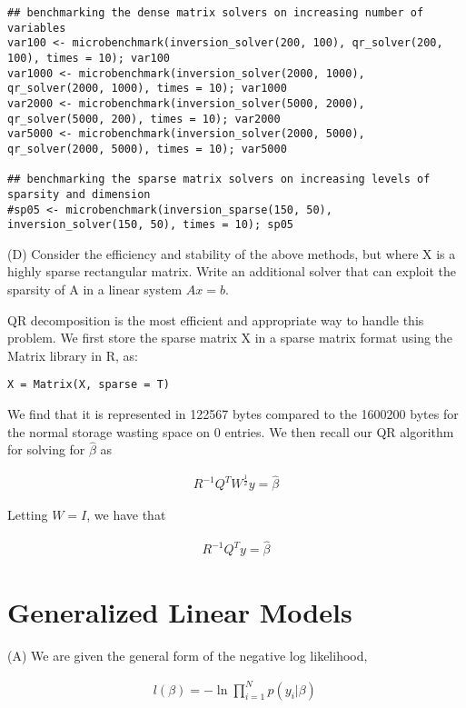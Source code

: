\documentclass{article}
\begin{document}
\begin{lstlisting}
## benchmarking the dense matrix solvers on increasing number of variables
var100 <- microbenchmark(inversion_solver(200, 100), qr_solver(200, 100), times = 10); var100
var1000 <- microbenchmark(inversion_solver(2000, 1000), qr_solver(2000, 1000), times = 10); var1000
var2000 <- microbenchmark(inversion_solver(5000, 2000), qr_solver(5000, 200), times = 10); var2000
var5000 <- microbenchmark(inversion_solver(2000, 5000), qr_solver(2000, 5000), times = 10); var5000

## benchmarking the sparse matrix solvers on increasing levels of sparsity and dimension
#sp05 <- microbenchmark(inversion_sparse(150, 50), inversion_solver(150, 50), times = 10); sp05

\end{lstlisting}

(D) Consider the efficiency and stability of the above methods, but where X is a highly sparse rectangular matrix. Write an additional solver that can exploit the sparsity of A in a linear system ${Ax = b}$. 

QR decomposition is the most efficient and appropriate way to handle this problem. We first store the sparse matrix X in a sparse matrix format using the Matrix library in R, as: 

\begin{lstlisting}
X = Matrix(X, sparse = T)
\end{lstlisting}

We find that it is represented in 122567 bytes compared to the 1600200 bytes for the normal storage wasting space on 0 entries. We then recall our QR algorithm for solving for $\hat{\beta}$ as 

\begin{align}
	{R^{-1}Q^T W^{\frac{1}{2}} y = \hat{\beta}}
\end{align}

Letting ${W = I}$, we have that

\begin{align}
	{R^{-1}Q^T y = \hat{\beta}}
\end{align}

\section{Generalized Linear Models}
(A) We are given the general form of the negative log likelihood, 

\begin{align}
	l(\beta) = -\ln\prod_{i = 1}^N p(y_i | \beta)\, 
\end{align}
\end{document}
